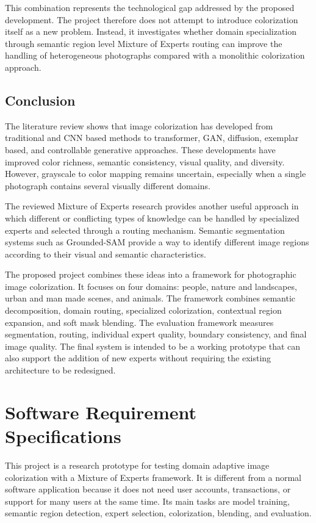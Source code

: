 \documentclass{FastFyp}
\begin{document}
This combination represents the technological gap addressed by the proposed development. The project therefore does not attempt to introduce colorization itself as a new problem. Instead, it investigates whether domain specialization through semantic region level Mixture of Experts routing can improve the handling of heterogeneous photographs compared with a monolithic colorization approach.

\section{Conclusion}

The literature review shows that image colorization has developed from traditional and CNN based methods to transformer, GAN, diffusion, exemplar based, and controllable generative approaches. These developments have improved color richness, semantic consistency, visual quality, and diversity. However, grayscale to color mapping remains uncertain, especially when a single photograph contains several visually different domains.

The reviewed Mixture of Experts research provides another useful approach in which different or conflicting types of knowledge can be handled by specialized experts and selected through a routing mechanism. Semantic segmentation systems such as Grounded-SAM provide a way to identify different image regions according to their visual and semantic characteristics.

The proposed project combines these ideas into a framework for photographic image colorization. It focuses on four domains: people, nature and landscapes, urban and man made scenes, and animals. The framework combines semantic decomposition, domain routing, specialized colorization, contextual region expansion, and soft mask blending. The evaluation framework measures segmentation, routing, individual expert quality, boundary consistency, and final image quality. The final system is intended to be a working prototype that can also support the addition of new experts without requiring the existing architecture to be redesigned.
 
\chapter{Software Requirement Specifications}

This project is a research prototype for testing domain adaptive image colorization with a Mixture of Experts framework. It is different from a normal software application because it does not need user accounts, transactions, or support for many users at the same time. Its main tasks are model training, semantic region detection, expert selection, colorization, blending, and evaluation.
\end{document}
